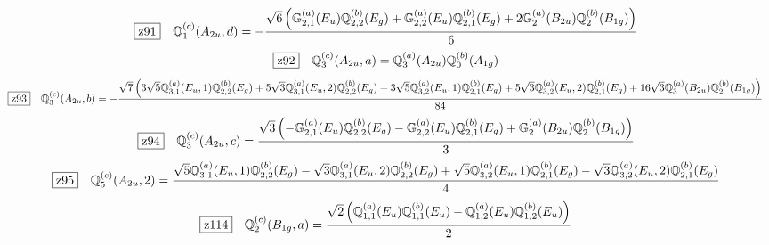 \documentclass[fleqn,10pt,landscape]{jsarticle}
\begin{document}
\begin{dmath*}
\hspace*{3mm}\fbox{z91}\quad \mathbb{Q}_{1}^{(c)}(A_{2u},d)=- \frac{\sqrt{6} \left(\mathbb{G}_{2,1}^{(a)}(E_{u}) \mathbb{Q}_{2,2}^{(b)}(E_{g}) + \mathbb{G}_{2,2}^{(a)}(E_{u}) \mathbb{Q}_{2,1}^{(b)}(E_{g}) + 2 \mathbb{G}_{2}^{(a)}(B_{2u}) \mathbb{Q}_{2}^{(b)}(B_{1g})\right)}{6}
\end{dmath*}
\begin{dmath*}
\hspace*{3mm}\fbox{z92}\quad \mathbb{Q}_{3}^{(c)}(A_{2u},a)=\mathbb{Q}_{3}^{(a)}(A_{2u}) \mathbb{Q}_{0}^{(b)}(A_{1g})
\end{dmath*}
\begin{dmath*}
\hspace*{3mm}\fbox{z93}\quad \mathbb{Q}_{3}^{(c)}(A_{2u},b)=- \frac{\sqrt{7} \left(3 \sqrt{5} \mathbb{Q}_{3,1}^{(a)}(E_{u},1) \mathbb{Q}_{2,2}^{(b)}(E_{g}) + 5 \sqrt{3} \mathbb{Q}_{3,1}^{(a)}(E_{u},2) \mathbb{Q}_{2,2}^{(b)}(E_{g}) + 3 \sqrt{5} \mathbb{Q}_{3,2}^{(a)}(E_{u},1) \mathbb{Q}_{2,1}^{(b)}(E_{g}) + 5 \sqrt{3} \mathbb{Q}_{3,2}^{(a)}(E_{u},2) \mathbb{Q}_{2,1}^{(b)}(E_{g}) + 16 \sqrt{3} \mathbb{Q}_{3}^{(a)}(B_{2u}) \mathbb{Q}_{2}^{(b)}(B_{1g})\right)}{84}
\end{dmath*}
\begin{dmath*}
\hspace*{3mm}\fbox{z94}\quad \mathbb{Q}_{3}^{(c)}(A_{2u},c)=\frac{\sqrt{3} \left(- \mathbb{G}_{2,1}^{(a)}(E_{u}) \mathbb{Q}_{2,2}^{(b)}(E_{g}) - \mathbb{G}_{2,2}^{(a)}(E_{u}) \mathbb{Q}_{2,1}^{(b)}(E_{g}) + \mathbb{G}_{2}^{(a)}(B_{2u}) \mathbb{Q}_{2}^{(b)}(B_{1g})\right)}{3}
\end{dmath*}
\begin{dmath*}
\hspace*{3mm}\fbox{z95}\quad \mathbb{Q}_{5}^{(c)}(A_{2u},2)=\frac{\sqrt{5} \mathbb{Q}_{3,1}^{(a)}(E_{u},1) \mathbb{Q}_{2,2}^{(b)}(E_{g}) - \sqrt{3} \mathbb{Q}_{3,1}^{(a)}(E_{u},2) \mathbb{Q}_{2,2}^{(b)}(E_{g}) + \sqrt{5} \mathbb{Q}_{3,2}^{(a)}(E_{u},1) \mathbb{Q}_{2,1}^{(b)}(E_{g}) - \sqrt{3} \mathbb{Q}_{3,2}^{(a)}(E_{u},2) \mathbb{Q}_{2,1}^{(b)}(E_{g})}{4}
\end{dmath*}
\begin{dmath*}
\hspace*{3mm}\fbox{z114}\quad \mathbb{Q}_{2}^{(c)}(B_{1g},a)=\frac{\sqrt{2} \left(\mathbb{Q}_{1,1}^{(a)}(E_{u}) \mathbb{Q}_{1,1}^{(b)}(E_{u}) - \mathbb{Q}_{1,2}^{(a)}(E_{u}) \mathbb{Q}_{1,2}^{(b)}(E_{u})\right)}{2}
\end{dmath*}
\end{document}
